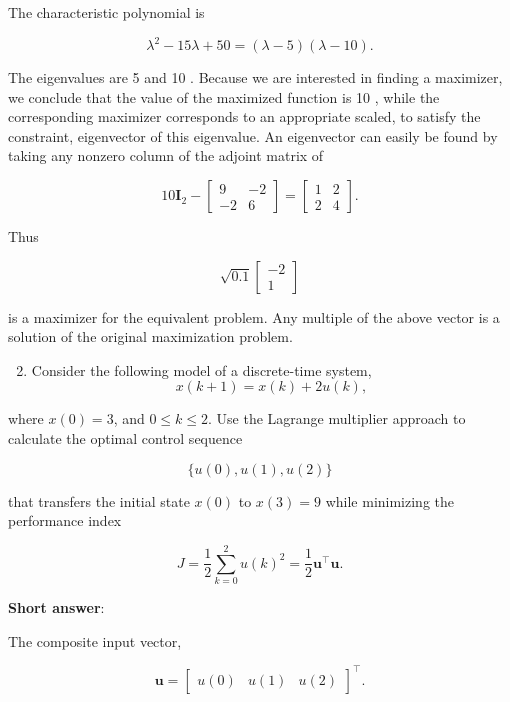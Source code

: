 The characteristic polynomial is

\[
	\lambda^{2}-15 \lambda+50=(\lambda-5)(\lambda-10) .
\]

The eigenvalues are 5 and 10 . Because we are interested in finding a maximizer, we conclude that the value of the maximized function is 10 , while the corresponding maximizer corresponds to an appropriate scaled, to satisfy the constraint, eigenvector of this eigenvalue. An eigenvector can easily be found by taking any nonzero column of the adjoint matrix of

\[
	10 \boldsymbol{I}_{2}-\left[\begin{array}{cc}
		9 & -2 \\
		-2 & 6
	\end{array}\right] = \left[\begin{array}{cc}
	1  & 2 \\
	2 & 4
	\end{array}\right].
\]

Thus

\[
	\sqrt{0.1}\left[\begin{array}{c}
		-2 \\
		1
	\end{array}\right]
\]

is a maximizer for the equivalent problem. Any multiple of the above vector is a solution of the original maximization problem.

\begin{enumerate}
	\setcounter{enumi}{1}
	\item Consider the following model of a discrete-time system,
	\[
		x(k+1)=x(k)+2 u(k),
	\]
\end{enumerate}

where \(x(0)=3\), and \(0 \leq k \leq 2\). Use the Lagrange multiplier approach to calculate the optimal control sequence

\[
	\{u(0), u(1), u(2)\}
\]

that transfers the initial state \(x(0)\) to \(x(3)=9\) while minimizing the performance index

\[
	J=\frac{1}{2} \sum_{k=0}^{2} u(k)^{2}=\frac{1}{2} \boldsymbol{u}^{\top} \boldsymbol{u} .
\]

\textbf{Short answer}: 

The composite input vector,

\[
	\boldsymbol{u}=\left[\begin{array}{lll}
		u(0) & u(1) & u(2)
	\end{array}\right]^{\top} .
\]

